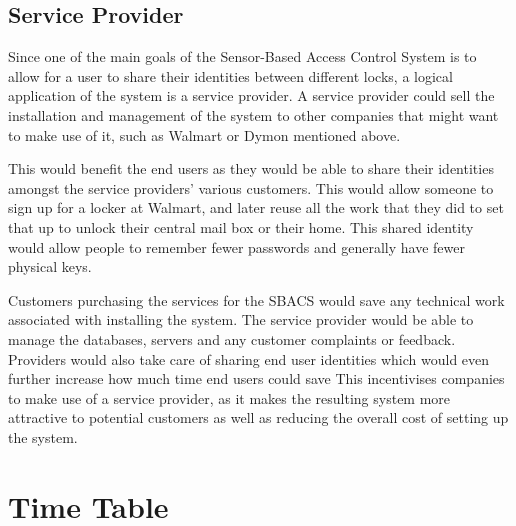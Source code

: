 \documentclass{article}
\begin{document}

\subsection{Service Provider}

Since one of the main goals of the Sensor-Based Access Control System is to allow for a user to share their identities
between different locks, a logical application of the system is a service provider. A service provider could sell the
installation and management of the system to other companies that might want to make use of it, such as Walmart or
Dymon mentioned above.

This would benefit the end users as they would be able to share their identities amongst the service providers' various
customers. This would allow someone to sign up for a locker at Walmart, and later reuse all the work that they did to
set that up to unlock their central mail box or their home. This shared identity would allow people to remember fewer
passwords and generally have fewer physical keys.

Customers purchasing the services for the SBACS would save any technical work associated with installing the system.
The service provider would be able to manage the databases, servers and any customer complaints or feedback. Providers
would also take care of sharing end user identities which would even further increase how much time end users could save
This incentivises companies to make use of a service provider, as it makes the resulting system more attractive to
potential customers as well as reducing the overall cost of setting up the system.

\newpage %
\section{Time Table}
\end{document}
